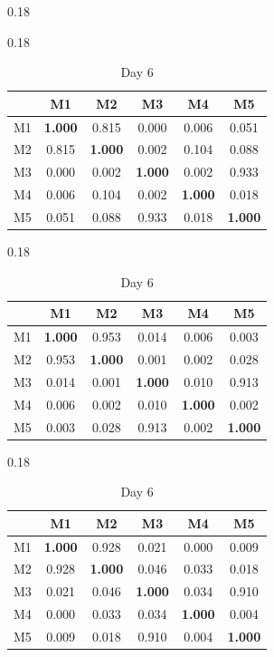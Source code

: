 \begin{table}[htbp]
\begin{subtable}[t]{0.18\linewidth}
\end{subtable}
\hfill
\begin{subtable}[t]{0.18\linewidth}
\centering
\caption*{Day 4}
\begin{tabular}{cccccc}
\toprule
& M1 & M2 & M3 & M4 & M5 \\
\midrule
M1 & \textbf{1.000} & 0.815 & 0.000 & 0.006 & 0.051 \\
M2 & 0.815 & \textbf{1.000} & 0.002 & 0.104 & 0.088 \\
M3 & 0.000 & 0.002 & \textbf{1.000} & 0.002 & 0.933 \\
M4 & 0.006 & 0.104 & 0.002 & \textbf{1.000} & 0.018 \\
M5 & 0.051 & 0.088 & 0.933 & 0.018 & \textbf{1.000} \\
\bottomrule
\end{tabular}
\end{subtable}
\hfill
\begin{subtable}[t]{0.18\linewidth}
\centering
\caption*{Day 5}
\begin{tabular}{cccccc}
\toprule
& M1 & M2 & M3 & M4 & M5 \\
\midrule
M1 & \textbf{1.000} & 0.953 & 0.014 & 0.006 & 0.003 \\
M2 & 0.953 & \textbf{1.000} & 0.001 & 0.002 & 0.028 \\
M3 & 0.014 & 0.001 & \textbf{1.000} & 0.010 & 0.913 \\
M4 & 0.006 & 0.002 & 0.010 & \textbf{1.000} & 0.002 \\
M5 & 0.003 & 0.028 & 0.913 & 0.002 & \textbf{1.000} \\
\bottomrule
\end{tabular}
\end{subtable}
\hfill
\begin{subtable}[t]{0.18\linewidth}
\centering
\caption*{Day 6}
\begin{tabular}{cccccc}
\toprule
& M1 & M2 & M3 & M4 & M5 \\
\midrule
M1 & \textbf{1.000} & 0.928 & 0.021 & 0.000 & 0.009 \\
M2 & 0.928 & \textbf{1.000} & 0.046 & 0.033 & 0.018 \\
M3 & 0.021 & 0.046 & \textbf{1.000} & 0.034 & 0.910 \\
M4 & 0.000 & 0.033 & 0.034 & \textbf{1.000} & 0.004 \\
M5 & 0.009 & 0.018 & 0.910 & 0.004 & \textbf{1.000} \\
\bottomrule
\end{tabular}
\end{subtable}

\end{table}
